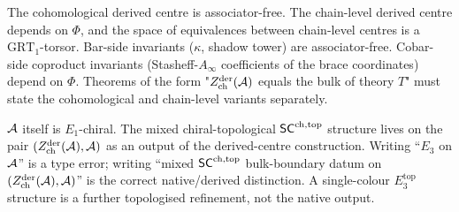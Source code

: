 \begin{remark}%
\label{rem:chd-associator-discipline}%
%
The cohomological derived centre is associator-free. The chain-level
derived centre depends on $\Phi$,
and the space of equivalences between chain-level centres is a
$\mathrm{GRT}_1$-torsor. Bar-side invariants ($\kappa$, shadow tower)
are associator-free. Cobar-side coproduct invariants
(Stasheff-$A_\infty$ coefficients of the brace coordinates) depend
on $\Phi$. Theorems of the form "$Z^{\mathrm{der}}_{\mathrm{ch}}(\mathcal{A})$
equals the bulk of theory $T$" must state the cohomological and
chain-level variants separately.
\end{remark}

\begin{remark}%
\label{rem:chd-native-vs-derived}%
%
$\mathcal{A}$ itself is $E_1$-chiral. The mixed chiral-topological
$\mathsf{SC}^{\mathrm{ch},\mathrm{top}}$ structure lives on the pair
$(Z^{\mathrm{der}}_{\mathrm{ch}}(\mathcal{A}),\mathcal{A})$ as an output of the
derived-centre construction. Writing ``$E_3$ on $\mathcal{A}$'' is a type
error; writing ``mixed $\mathsf{SC}^{\mathrm{ch},\mathrm{top}}$ bulk-boundary datum on
$(Z^{\mathrm{der}}_{\mathrm{ch}}(\mathcal{A}),\mathcal{A})$'' is the correct
native/derived distinction. A single-colour $E_3^{\mathrm{top}}$
structure is a further topologised refinement, not the native output.
\end{remark}


